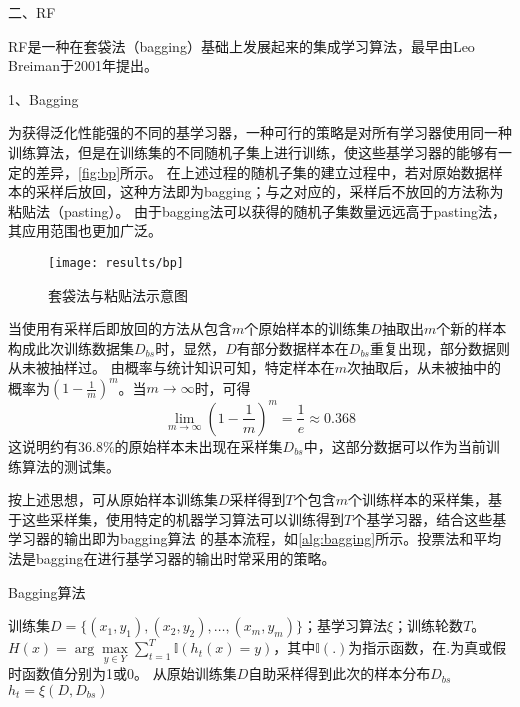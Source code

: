 二、RF

RF是一种在套袋法（bagging）基础上发展起来的集成学习算法，最早由Leo Breiman于2001年提出\cite{breiman2001}。

1、Bagging

为获得泛化性能强的不同的基学习器，一种可行的策略是对所有学习器使用同一种训练算法，但是在训练集的不同随机子集上进行训练，使这些基学习器的能够有一定的差异，\autoref{fig:bp}所示。
在上述过程的随机子集的建立过程中，若对原始数据样本的采样后放回，这种方法即为bagging；与之对应的，采样后不放回的方法称为粘贴法（pasting）\cite{Aurélien2018,Zhou2016}。
由于bagging法可以获得的随机子集数量远远高于pasting法，其应用范围也更加广泛。
\begin{figure}[htbp]
    \centering
    \texttt{[image: results/bp]}
    \caption[套袋法与粘贴法示意图]{\label{fig:bp}套袋法与粘贴法示意图\cite{Aurélien2018}}
\end{figure}

当使用有采样后即放回的方法从包含$m$个原始样本的训练集$D$抽取出$m$个新的样本构成此次训练数据集$D_{bs}$时，显然，$D$有部分数据样本在$D_{bs}$重复出现，部分数据则从未被抽样过。
由概率与统计知识可知，特定样本在$m$次抽取后，从未被抽中的概率为$(1-\frac{1}{m})^m$。当$m \to \infty$时，可得
\begin{equation}
    \label{equ:me}
    \lim_{m \to \infty}{(1-\frac{1}{m})}^m = \frac{1}{e} \approx 0.368
\end{equation}
这说明约有36.8\%的原始样本未出现在采样集$D_{bs}$中，这部分数据可以作为当前训练算法的测试集。

按上述思想，可从原始样本训练集$D$采样得到$T$个包含$m$个训练样本的采样集，基于这些采样集，使用特定的机器学习算法可以训练得到$T$个基学习器，结合这些基学习器的输出即为bagging算法
的基本流程，如\autoref{alg:bagging}所示。投票法和平均法是bagging在进行基学习器的输出时常采用的策略。
\begin{breakablealgorithm}
    \caption[Bagging算法]{Bagging算法\cite{Zhou2016}}
    \label{alg:bagging}
    \begin{algorithmic}[1] %
        \Require 训练集$D=\{(x_1,y_1),(x_2,y_2),\dots,(x_m,y_m)\}$；基学习算法$\xi$；训练轮数$T$。
        \Ensure $H(x)=\arg \max \limits_{y \in Y} \sum_{t=1}^T \mathbb{I}(h_t(x)=y)$，其中$\mathbb{I}(.)$为指示函数，在$.$为真或假时函数值分别为1或0。
                \State 从原始训练集$D$自助采样得到此次的样本分布$D_{bs}$
                \State $h_t=\xi (D,D_{bs})$
        \EndFor
    \end{algorithmic}
\end{breakablealgorithm}

